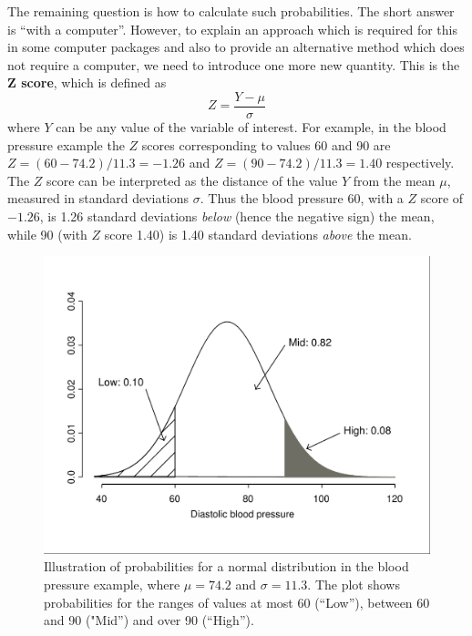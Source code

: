 The remaining question is how to calculate such probabilities. The
short answer is ``with a computer''. However, to explain
an approach which is required for this in some computer packages and also
to provide an alternative method which does not require a computer, we
need to introduce one more new quantity. This is the \textbf{Z score},
which is defined as
\begin{equation}
Z = \frac{Y-\mu}{\sigma}
\label{Zscore}
\end{equation}
where $Y$ can be any value of the variable of interest. For example, in
the blood pressure example the $Z$ scores corresponding to values 60 and
90 are $Z=(60-74.2)/11.3=-1.26$ and $Z=(90-74.2)/11.3=1.40$
respectively. The $Z$ score can be interpreted as the distance of the
value $Y$ from the mean $\mu$, measured in standard deviations $\sigma$.
Thus the blood pressure 60, with a $Z$ score of $-1.26$, is 1.26 standard
deviations \emph{below} (hence the negative sign) the mean, while 90
(with $Z$ score 1.40) is 1.40 standard deviations \emph{above} the mean.

\begin{figure}[t]
\caption{
Illustration of probabilities for a normal distribution in
the blood pressure example, where $\mu=74.2$ and $\sigma=11.3$. The
plot shows probabilities for the ranges of values at most 60
(``Low''), between 60 and 90 ("Mid'') and over 90 (``High'').
}
\label{f_normbp}
\begin{center}
\includegraphics[width=12cm]{normbp}
\end{center}
\vspace*{-2ex}
\end{figure}


